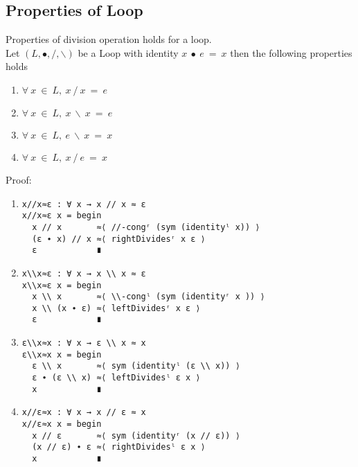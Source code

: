 \subsection{Properties of Loop}
Properties of division operation holds for a loop.\\
Let $(L, ∙, /, \backslash)$ be a Loop with identity $x\ ∙\ e\ =\ x$ then the following properties holds 
\begin{enumerate}
\item \(\forall\ x\ \in\ L, \ x \ /\  x\ =\ e\) 
\item \(\forall \ x\ \in\ L,\  x\ \backslash \ x\ =\ e\)
\item \(\forall \ x\ \in\ L,\ e\ \backslash \ x\ =\ x\) 
\item \(\forall \ x\ \in\ L, \ x\ /\ e\ =\ x\) 
\end{enumerate}
Proof:
\begin{enumerate}
\item 
\begin{verbatim}
x//x≈ε : ∀ x → x // x ≈ ε
x//x≈ε x = begin
  x // x       ≈⟨ //-congʳ (sym (identityˡ x)) ⟩
  (ε ∙ x) // x ≈⟨ rightDividesʳ x ε ⟩
  ε            ∎
\end{verbatim}
\item
\begin{verbatim}
x\\x≈ε : ∀ x → x \\ x ≈ ε
x\\x≈ε x = begin
  x \\ x       ≈⟨ \\-congˡ (sym (identityʳ x )) ⟩
  x \\ (x ∙ ε) ≈⟨ leftDividesʳ x ε ⟩
  ε            ∎
\end{verbatim}
\item
\begin{verbatim}
ε\\x≈x : ∀ x → ε \\ x ≈ x
ε\\x≈x x = begin
  ε \\ x       ≈⟨ sym (identityˡ (ε \\ x)) ⟩
  ε ∙ (ε \\ x) ≈⟨ leftDividesˡ ε x ⟩
  x            ∎
\end{verbatim}
\item
\begin{verbatim}
x//ε≈x : ∀ x → x // ε ≈ x
x//ε≈x x = begin
  x // ε       ≈⟨ sym (identityʳ (x // ε)) ⟩
  (x // ε) ∙ ε ≈⟨ rightDividesˡ ε x ⟩
  x            ∎
\end{verbatim}
\end{enumerate}
